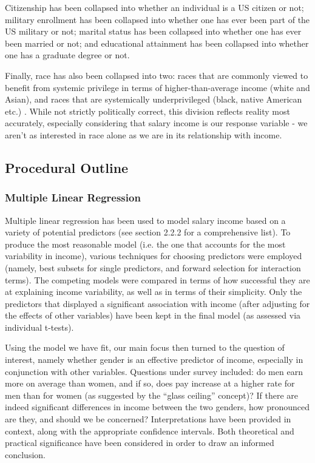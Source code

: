 \documentclass{article}
\begin{document}
Citizenship has been collapsed into whether an individual is a US citizen or not; military enrollment has been collapsed into whether one has ever been part of the US military or not; marital status has been collapsed into whether one has ever been married or not; and educational attainment has been collapsed into whether one has a graduate degree or not. 

Finally, race has also been collapsed into two: races that are commonly viewed to benefit from systemic privilege in terms of higher-than-average income (white and Asian), and races that are systemically underprivileged (black, native American etc.) \cite{aei, wip}. While not strictly politically correct, this division reflects reality most accurately, especially considering that salary income is our response variable - we aren't as interested in race alone as we are in its relationship with income.

\subsection{Procedural Outline}

\subsubsection{Multiple Linear Regression}

Multiple linear regression has been used to model salary income based on a variety of potential predictors (see section 2.2.2 for a comprehensive list). To produce the most reasonable model (i.e. the one that accounts for the most variability in income), various techniques for choosing predictors were employed (namely, best subsets for single predictors, and forward selection for interaction terms). The competing models were compared in terms of how successful they are at explaining income variability, as well as in terms of their simplicity. Only the predictors that displayed a significant association with income (after adjusting for the effects of other variables) have been kept in the final model (as assessed via individual t-tests).

Using the model we have fit, our main focus then turned to the question of interest, namely whether gender is an effective predictor of income, especially in conjunction with other variables. Questions under survey included: do men earn more on average than women, and if so, does pay increase at a higher rate for men than for women (as suggested by the ``glass ceiling'' concept)? If there are indeed significant differences in income between the two genders, how pronounced are they, and should we be concerned? Interpretations have been provided in context, along with the appropriate confidence intervals. Both theoretical and practical significance have been considered in order to draw an informed conclusion.
\end{document}
